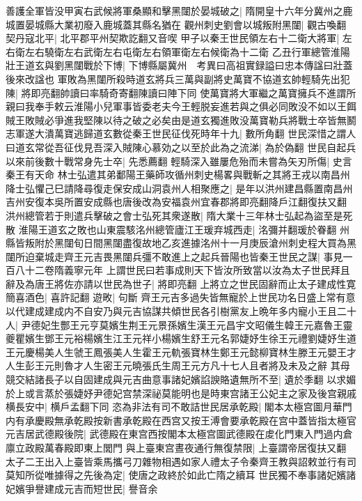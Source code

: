 善護全軍皆没甲寅右武候將軍桑顯和擊黑闥於晏城破之|{
	隋開皇十六年分冀州之鹿城置晏城縣大業初廢入鹿城蓋其縣名猶在}
觀州刺史劉會以城叛附黑闥|{
	觀古喚翻}
契丹寇北平|{
	北平郡平州契欺訖翻又音喫}
甲子以秦王世民領左右十二衛大將軍|{
	左右衛左右驍衛左右武衛左右屯衛左右領軍衛左右候衛為十二衛}
乙丑行軍總管淮陽壯王道玄與劉黑闥戰於下博|{
	下博縣屬冀州　考異曰高祖實録謚曰忠本傳諡曰壯蓋後來改諡也}
軍敗為黑闥所殺時道玄將兵三萬與副將史萬寶不協道玄帥輕騎先出犯陳|{
	將即亮翻帥讀曰率騎奇寄翻陳讀曰陣下同}
使萬寶將大軍繼之萬寶擁兵不進謂所親曰我奉手敕云淮陽小兒軍事皆委老夫今王輕脱妄進若與之俱必同敗没不如以王餌賊王敗賊必爭進我堅陳以待之破之必矣由是道玄獨進敗没萬寶勒兵將戰士卒皆無鬭志軍遂大潰萬寶逃歸道玄數從秦王世民征伐死時年十九|{
	數所角翻}
世民深惜之謂人曰道玄常從吾征伐見吾深入賊陳心慕効之以至於此為之流涕|{
	為於偽翻}
世民自起兵以來前後數十戰常身先士卒|{
	先悉薦翻}
輕騎深入雖屢危殆而未嘗為矢刃所傷|{
	史言秦王有天命}
林士弘遣其弟鄱陽王藥師攻循州刺史楊畧與戰斬之其將王戎以南昌州降士弘懼己巳請降尋復走保安成山洞袁州人相聚應之|{
	是年以洪州建昌縣置南昌州吉州安復本吳所置安成縣也唐後改為安福袁州宜春郡將即亮翻降戶江翻復扶又翻}
洪州總管若于則遣兵擊破之會士弘死其衆遂散|{
	隋大業十三年林士弘起為盜至是死散}
淮陽王道玄之敗也山東震駭洺州總管廬江王瑗弃城西走|{
	洺彌并翻瑗於眷翻}
州縣皆叛附於黑闥旬日間黑闥盡復故地乙亥進據洺州十一月庚辰滄州刺史程大買為黑闥所迫棄城走齊王元吉畏黑闥兵彊不敢進上之起兵晉陽也皆秦王世民之謀|{
	事見一百八十二卷隋義寧元年}
上謂世民曰若事成則天下皆汝所致當以汝為太子世民拜且辭及為唐王將佐亦請以世民為世子|{
	將即亮翻}
上將立之世民固辭而止太子建成性寛簡喜酒色|{
	喜許記翻}
遊畋|{
	句斷}
齊王元吉多過失皆無寵於上世民功名日盛上常有意以代建成建成内不自安乃與元吉協謀共傾世民各引樹黨友上晩年多内寵小王且二十人|{
	尹德妃生酆王元亨莫嬪生荆王元景孫嬪生漢王元昌宇文昭儀生韓王元嘉魯王靈夔瞿嬪生鄧王元裕楊嬪生江王元祥小楊嬪生舒王元名郭婕妤生徐王元禮劉婕妤生道王元慶楊美人生虢王鳳張美人生霍王元軌張寶林生鄭王元懿柳寶林生滕王元嬰王才人生彭王元則魯才人生密王元曉張氏生周王元方凡十七人且者將及未及之辭}
其母競交結諸長子以自固建成與元吉曲意事諸妃嬪諂諛賂遺無所不至|{
	遺於季翻}
以求媚於上或言蒸於張婕妤尹德妃宫禁深祕莫能明也是時東宫諸王公妃主之家及後宫親戚横長安中|{
	横戶孟翻下同}
恣為非法有司不敢詰世民居承乾殿|{
	閣本太極宫圖月華門内有承慶殿無承乾殿按新書承乾殿在西宫又按王溥會要承乾殿在宫中蓋皆指太極官}
元吉居武德殿後院|{
	武德殿在東宫西按閣本太極宫圖武德殿在䖍化門東入門過内倉廪立政殿萬春殿即東上閭門}
與上臺東宫晝夜通行無復禁限|{
	上臺謂帝居復扶又翻}
太子二王出入上臺皆乘馬攜弓刀雜物相遇如家人禮太子令秦齊王教與詔敕並行有司莫知所從唯據得之先後為定|{
	使唐之政終於如此亡隋之續耳}
世民獨不奉事諸妃嬪諸妃嬪爭譽建成元吉而短世民|{
	譽音余}
